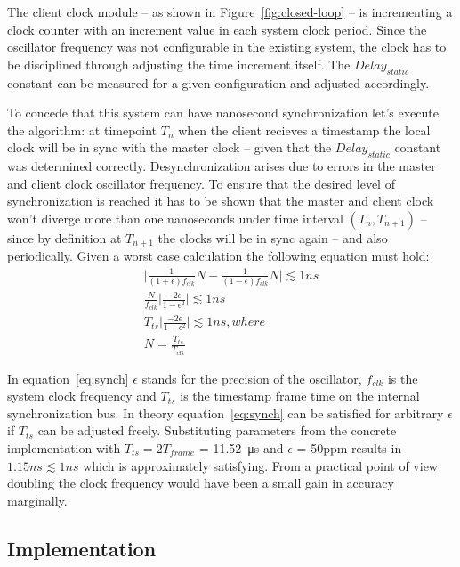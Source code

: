 \documentclass[journal]{IEEEtran}
\begin{document}
The client clock module -- as shown in Figure~\ref{fig:closed-loop} --
is incrementing a clock counter with an increment value in each system clock period. Since the oscillator frequency was not
configurable in the existing system, the clock has to be disciplined through adjusting the time increment itself. The $Delay_{static}$ constant can be measured
for a given configuration and adjusted accordingly.

To concede that this system can have nanosecond synchronization let's execute the algorithm: at timepoint $T_n$ when the client recieves a timestamp the local clock will be in sync with
the master clock -- given that the $Delay_{static}$ constant was determined correctly. Desynchronization arises due to errors in the master and client clock oscillator frequency. 
To ensure that the desired level of synchronization is reached it has to be shown that the master and client clock won't diverge more than one nanoseconds 
under time interval $(T_n,T_{n+1})$  -- since by definition at $T_{n+1}$ the clocks will be in sync again -- and also periodically. Given a worst case calculation the
following equation must hold:
\begin{equation}\label{eq:synch}
\begin{aligned} 
\lvert \frac{1}{(1+\epsilon)f_{clk}}N - \frac{1}{(1-\epsilon)f_{clk}}N  \rvert  \lesssim 1 ns \\
\frac{N}{f_{clk}} \lvert \frac{-2\epsilon}{1 - \epsilon ^2} \rvert \lesssim 1 ns \\
T_{ts} \lvert \frac{-2\epsilon}{1 - \epsilon ^2} \rvert \lesssim 1 ns , where \\
N = \frac{T_{ts}}{T_{clk}}
\end{aligned}
\end{equation}

In equation~\ref{eq:synch} $\epsilon$ stands for the precision of the oscillator, $f_{clk}$  is the system clock frequency and $T_{ts}$ is the timestamp frame time on the internal synchronization bus. In theory equation~\ref{eq:synch} can be satisfied for arbitrary $\epsilon$ if $T_{ts}$ can be adjusted freely. Substituting parameters from the concrete implementation with $T_{ts} = 2T_{frame}$ = \SI{11.52}{\micro\second} and $\epsilon$ = 50ppm results in $1.15 ns \lesssim 1 ns$ which is approximately satisfying. From a practical point of view doubling the clock frequency would have been a small gain in accuracy marginally.

\subsection{Implementation}
\end{document}
